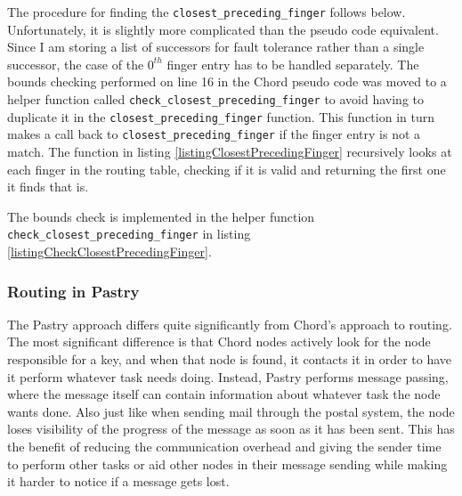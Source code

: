 

The procedure for finding the \verb=closest_preceding_finger= follows below. Unfortunately, it is slightly more complicated than the pseudo code equivalent. Since I am storing a list of successors for fault tolerance rather than a single successor, the case of the $ 0^{th} $ finger entry has to be handled separately. 
The bounds checking performed on line 16 in the Chord pseudo code was moved to a helper function called \verb=check_closest_preceding_finger= to avoid having to duplicate it in the \verb=closest_preceding_finger= function.
This function in turn makes a call back to \verb=closest_preceding_finger= if the finger entry is not a match.
The function in listing \ref{listingClosestPrecedingFinger} recursively looks at each finger in the routing table, checking if it is valid and returning the first one it finds that is.



The bounds check is implemented in the helper function \verb=check_closest_preceding_finger= in listing \ref{listingCheckClosestPrecedingFinger}.



\subsubsection{Routing in Pastry}
\label{sec:routingInPastry}
The Pastry approach differs quite significantly from Chord's approach to routing.
The most significant difference is that Chord nodes actively look for the node responsible for a key, and when that node is found, it contacts it in order to have it perform whatever task needs doing. Instead, Pastry performs message passing, where the message itself can contain information about whatever task the node wants done.
Also just like when sending mail through the postal system, the node loses visibility of the progress of the message as soon as it has been sent. This has the benefit of reducing the communication overhead and giving the sender time to perform other tasks or aid other nodes in their message sending while making it harder to notice if a message gets lost.

